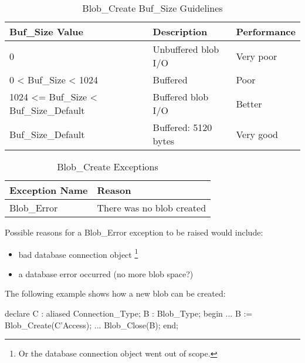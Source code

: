 \documentclass[english,letterpaper]{book}
\begin{document}
\begin{table}
   \begin{center}
      \begin{tabular}{lll}
         Buf\_Size Value                        &  Description          &  Performance\\
         \hline 
         0                                      &  Unbuffered blob I/O  &  Very poor\\
         0 < Buf\_Size < 1024                   &  Buffered             &  Poor\\
         1024 <= Buf\_Size < Buf\_Size\_Default & Buffered blob I/O     &  Better\\
         Buf\_Size\_Default                     &  Buffered: 5120 bytes &  Very good\\
      \end{tabular}
   \end{center}
   \caption{Blob\_Create Buf\_Size Guidelines}\label{t:bcbsgx}
\end{table}

\begin{table}
   \begin{center}
      \begin{tabular}{ll}
         Exception Name    &  Reason\\
         \hline 
         Blob\_Error       &  There was no blob created\\
      \end{tabular}
   \end{center}
   \caption{Blob\_Create Exceptions}\label{t:blbcx}
\end{table}

Possible reasons for a Blob\_Error exception to be raised would include:

\begin{itemize}
   \item bad database connection object%
      \footnote{Or the database connection object went out of scope.}
   \item a database error occurred (no more blob space?)
\end{itemize}

The following example shows how a new blob can be created:

\begin{Example}
declare
   C :   aliased Connection_Type;
   B :   Blob_Type;
begin
   ...
   B := Blob_Create(C'Access);
   ...
   Blob_Close(B);
end;
\end{Example}
\end{document}
